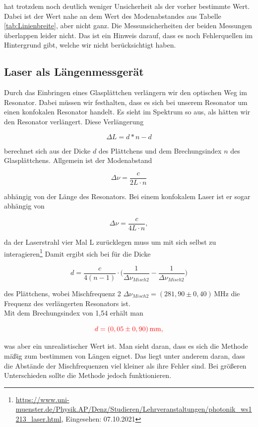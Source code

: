  hat trotzdem noch deutlich weniger Unsicherheit als der vorher bestimmte Wert. Dabei ist der Wert nahe an dem Wert des 
 Modenabstandes aus Tabelle \ref{tab:Linienbreite}, aber nicht ganz. Die Messunsicherheiten der beiden Messungen überlappen leider nicht. Das ist ein Hinweis darauf, dass es noch Fehlerquellen im Hintergrund gibt, welche wir nicht
 berücksichtigt haben.

 \subsection*{Laser als Längenmessgerät}

 Durch das Einbringen eines Glasplättchen verlängern wir den optischen Weg im Resonator. Dabei müssen wir 
 festhalten, dass es sich bei unserem Resonator um einen konfokalen Resonator handelt. Es sieht im Spektrum so aus, 
 als hätten wir den Resonator verlängert. Diese Verlängerung 

 \begin{equation*}
     \Delta L = d*n - d
 \end{equation*}

 berechnet sich aus der Dicke $d$ des Plättchens und dem Brechungsindex $n$ des Glasplättchens. Allgemein ist der 
 Modenabstand 
 
 \begin{equation*}
     \Delta\nu = \frac{c}{2L\cdot n}
 \end{equation*}

 abhängig von der Länge des Resonators. Bei einem konfokalem Laser ist er sogar abhängig von 

 \begin{equation*}
    \Delta\nu = \frac{c}{4L\cdot n},
\end{equation*}

da der Laserstrahl vier Mal L zurücklegen muss um mit sich selbst zu interagieren\footnote{\url{https://www.uni-muenster.de/Physik.AP/Denz/Studieren/Lehrveranstaltungen/photonik_ws1213_laser.html}, Eingesehen: 07.10.2021}
Damit ergibt sich bei für die Dicke 

\begin{equation}
    d = \frac{c}{4(n-1)}\cdot \biggl( \frac{1}{\Delta\nu_{Misch2}}-\frac{1}{\Delta\nu_{Misch2}} \biggl)
\end{equation}


des Plättchens, wobei Mischfrequenz 2 $\Delta \nu_{Misch2} = (281,90\pm0,40)\,\mathrm{MHz}$ die Frequenz des verlängerten Resonators ist. \\
Mit dem Brechungsindex von 1,54 \cite[S.1358]{Chemie1949} erhält man 

\begin{equation}
    \textcolor{red}{d = (0,05 \pm 0,90)\,\mathrm{mm,}}
\end{equation}

was aber ein unrealistischer Wert ist. Man sieht daran, dass es sich die Methode mäßig zum bestimmen von Längen eignet. Das liegt unter anderem daran, dass die
Abstände der Mischfrequenzen viel kleiner als ihre Fehler sind. Bei größeren Unterschieden sollte die Methode jedoch funktionieren. 